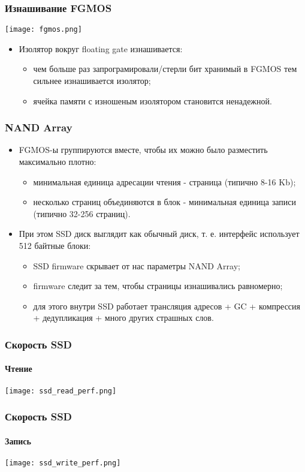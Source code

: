 \begin{frame}
\frametitle{Изнашивание FGMOS}
\begin{center}
  \texttt{[image: fgmos.png]}
\end{center}
\begin{itemize}
  \item Изолятор вокруг floating gate изнашивается:
  \begin{itemize}
    \item чем больше раз запрограмировали/стерли бит хранимый в FGMOS тем
    сильнее изнашивается изолятор;
    \item ячейка памяти с изношеным изолятором становится ненадежной.
  \end{itemize}
\end{itemize}
\end{frame}

\begin{frame}
\frametitle{NAND Array}
\begin{itemize}
  \item FGMOS-ы группируются вместе, чтобы их можно было разместить максимально
  плотно:
  \begin{itemize}
    \item минимальная единица адресации чтения - страница (типично 8-16 Kb);
    \item несколько страниц объединяются в блок - минимальная единица записи
    (типично 32-256 страниц).
  \end{itemize}
  \item При этом SSD диск выглядит как обычный диск, т. е. интерфейс использует
  512 байтные блоки:
  \begin{itemize}
    \item SSD firmware скрывает от нас параметры NAND Array;
    \item firmware следит за тем, чтобы страницы изнашивались равномерно;
    \item для этого внутри SSD работает трансляция адресов + GC + компрессия +
    дедупликация + много других страшных слов.
  \end{itemize}
\end{itemize}
\end{frame}

\begin{frame}
\frametitle{Скорость SSD}
\framesubtitle{Чтение}
\begin{center}
  \texttt{[image: ssd\_read\_perf.png]}
\end{center}
\end{frame}

\begin{frame}
\frametitle{Скорость SSD}
\framesubtitle{Запись}
\begin{center}
  \texttt{[image: ssd\_write\_perf.png]}
\end{center}
\end{frame}

